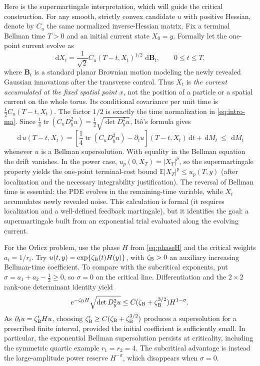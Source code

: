 \documentclass[11pt]{article}
\theoremstyle{definition}
\theoremstyle{remark}
\numberwithin{equation}{section}
\newcommand{\E}{\mathbb E}
\newcommand{\dd}{\,\mathrm d}
\begin{document}
Here is the supermartingale interpretation, which will guide the
critical construction. For any smooth, strictly convex candidate
$u$ with positive Hessian, denote by $C_u$ the same normalized
inverse-Hessian matrix. Fix a terminal Bellman time $T>0$ and an
initial current state $X_0=y$. Formally let the one-point
current evolve as
\[
 \dd X_t=\frac1{\sqrt2}C_u(T-t,X_t)^{1/2}
                  \,\dd\mathbf B_t,\qquad 0\le t\le T,
\]
where $\mathbf B_t$ is a standard planar Brownian motion modeling
the newly revealed Gaussian innovations after the transverse
control. Thus $X_t$ is \emph{the current accumulated at the fixed
spatial point $x$}, not the position of a particle or a spatial
current on the whole torus. Its conditional covariance per unit
time is $\frac12C_u(T-t,X_t)$. The factor $1/2$ is exactly the
time normalization in \eqref{eq:intro-ma}. Since
$\frac14\operatorname{tr}(C_uD_y^2u)
 =\frac12\sqrt{\det D_y^2u}$, It\^o's formula gives
\begin{equation}\label{eq:intro-bellman-supermart}
 \dd\,u(T-t,X_t)
 =\left[\frac14\operatorname{tr}(C_uD_y^2u)
              -\partial_tu\right](T-t,X_t)\dd t
   +\dd M_t\ \le\ \dd M_t
\end{equation}
whenever $u$ is a Bellman supersolution. With equality in the
Bellman equation the drift vanishes. In the power case,
$u_p(0,X_T)=|X_T|^p$, so the supermartingale property yields the
one-point terminal-cost bound $\E|X_T|^p\le u_p(T,y)$ (after
localization and the necessary integrability justification).
The reversal of Bellman time is essential: the PDE evolves in the remaining-time variable,
while $X_t$ accumulates newly revealed noise. This calculation is
formal (it requires localization and a well-defined feedback
martingale), but it identifies the goal: a supermartingale built
from an exponential trial evaluated along the evolving current.

For the Orlicz problem, use the phase $H$ from \eqref{eq:phaseH}
and the critical weights $a_i=1/r_i$.
\label{not:bellmanclock}
Try $u(t,y)=\exp\{\zeta_{\rm B}(t)H(y)\}$, with
$\zeta_{\rm B}>0$ an auxiliary increasing Bellman-time coefficient.
\label{not:bellmansigma}
To compare with the subcritical exponents, put
$\sigma=a_1+a_2-\frac12\ge0$, so $\sigma=0$ on the critical
line. Differentiation and the $2\times2$ rank-one determinant
identity yield
\begin{equation}\label{eq:intro-bellman-determinant}
 e^{-\zeta_{\rm B}H}\sqrt{\det D_y^2u}
 \le C(\zeta_{\rm B}+\zeta_{\rm B}^{3/2})H^{1-\sigma}.
\end{equation}
As $\partial_tu=\zeta_{\rm B}'Hu$, choosing
$\zeta_{\rm B}'\ge C(\zeta_{\rm B}+\zeta_{\rm B}^{3/2})$
produces a supersolution for a prescribed finite interval,
provided the initial coefficient is sufficiently small.
In particular, the exponential Bellman supersolution persists
at criticality, including the symmetric quartic example
$r_1=r_2=4$. The subcritical advantage is instead the
large-amplitude power reserve $H^{-\sigma}$, which disappears
when $\sigma=0$.
\end{document}
